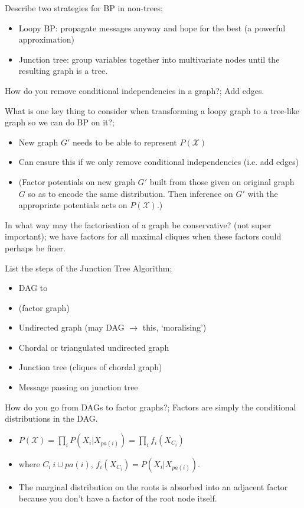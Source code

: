 \documentclass{article}
\begin{document}
Describe two strategies for BP in non-trees; \begin{itemize}
    \item Loopy BP: propagate messages anyway and hope for the best (a powerful approximation)
    \item Junction tree: group variables together into multivariate nodes until the resulting graph is a tree.
\end{itemize}

How do you remove conditional independencies in a graph?; Add edges.

What is one key thing to consider when transforming a loopy graph to a tree-like graph so we can do BP on it?; \begin{itemize}
    \item New graph $G'$ needs to be able to represent $P(\mathcal{X})$
    \item Can ensure this if we only remove conditional independencies (i.e. add edges)
    \item (Factor potentials on new graph $G'$ built from those given on original graph $G$ so as to encode the same distribution. Then inference on $G'$ with the appropriate potentials acts on $P(\mathcal{X})$.)
\end{itemize}

In what way may the factorisation of a graph be conservative? (not super important); we have factors for all maximal cliques when these factors could perhaps be finer.

List the steps of the Junction Tree Algorithm; \begin{itemize}
    \item DAG to
    \item (factor graph)
    \item Undirected graph (may DAG $\rightarrow$ this, `moralising')
    \item Chordal or triangulated undirected graph
    \item Junction tree (cliques of chordal graph)
    \item Message passing on junction tree
\end{itemize}

How do you go from DAGs to factor graphs?; Factors are simply the conditional distributions in the DAG. \begin{itemize}
    \item $P(\mathcal{X})=\prod_i P(X_i|X_{pa(i)})= \prod_i f_i(X_{C_i})$
    \item where $C_i \ i\cup pa(i)$, $f_i(X_{C_i})=P(X_i|X_{pa(i)})$.
    \item The marginal distribution on the roots is absorbed into an adjacent factor because you don't have a factor of the root node itself.
\end{itemize}
\end{document}
